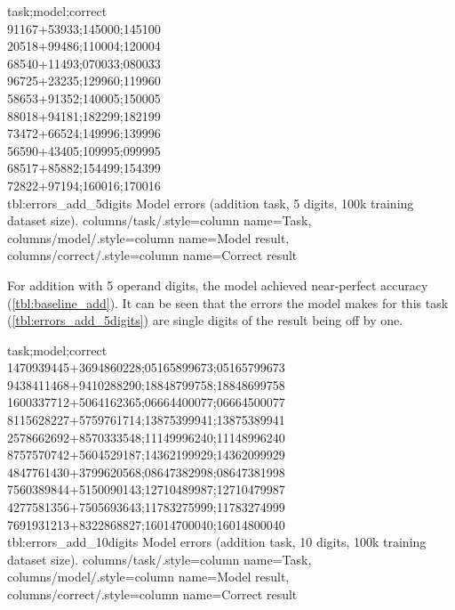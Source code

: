 {
    task;model;correct\\
    91167+53933;145000;145100\\
    20518+99486;110004;120004\\
    68540+11493;070033;080033\\
    96725+23235;129960;119960\\
    58653+91352;140005;150005\\
    88018+94181;182299;182199\\
    73472+66524;149996;139996\\
    56590+43405;109995;099995\\
    68517+85882;154499;154399\\
    72822+97194;160016;170016\\
}
{tbl:errors_add_5digits}
{
    Model errors (addition task, 5 digits, 100k training dataset size).
}
{
    columns/task/.style={column name={Task}},
    columns/model/.style={column name={Model result}},
    columns/correct/.style={column name={Correct result}}
}

For addition with 5 operand digits, the model achieved near-perfect accuracy (\cref{tbl:baseline_add}).
It can be seen that the errors the model makes for this task (\cref{tbl:errors_add_5digits}) are single digits of the result being off by one.



{
    task;model;correct\\
    1470939445+3694860228;05165899673;05165799673\\
    9438411468+9410288290;18848799758;18848699758\\
    1600337712+5064162365;06664400077;06664500077\\
    8115628227+5759761714;13875399941;13875389941\\
    2578662692+8570333548;11149996240;11148996240\\
    8757570742+5604529187;14362199929;14362099929\\
    4847761430+3799620568;08647382998;08647381998\\
    7560389844+5150090143;12710489987;12710479987\\
    4277581356+7505693643;11783275999;11783274999\\
    7691931213+8322868827;16014700040;16014800040\\
}
{tbl:errors_add_10digits}
{
    Model errors (addition task, 10 digits, 100k training dataset size).
}
{
    columns/task/.style={column name={Task}},
    columns/model/.style={column name={Model result}},
    columns/correct/.style={column name={Correct result}}
}

